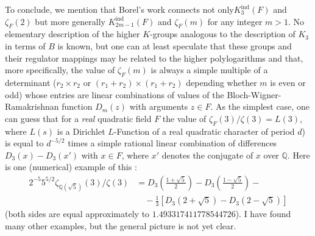 To conclude, we mention that Borel's work connects not only\break $K^{\text{ind}}_{3}(F)$ and $\zeta_{F}(2)$ but more generally $K^{\text{ind}}_{2m-1}(F)$ and $\zeta_{F}(m)$ for any integer $m>1$. No elementary description of the higher $K$-groups analogous to the description of $K_{3}$ in terms of $B$ is known, but one can at least speculate that these groups and their regulator mappings may be related to the higher polylogarithms and that, more specifically, the value of $\zeta_{F}(m)$ is always a simple multiple of a determinant ($r_{2}\times r_{2}$ or $(r_{1}+r_{2})\times (r_{1}+r_{2})$ depending whether $m$ is even or odd) whose entries are linear combinations of values of the Bloch-Wigner-Ramakrishnan function $D_{m}(z)$ with arguments $z\in F$. As the simplest case, one can guess that for a {\em real} quadratic field $F$ the value of $\zeta_{F}(3)/\zeta(3)=L(3)$, where $L(s)$ is a Dirichlet $L$-Function of a real quadratic character of period $d$) is equal to $d^{-5/2}$ times a simple rational linear combination of differences $D_{3}(x)-D_{3}(x')$ with $x\in F$, where $x'$ denotes the conjugate of $x$ over $\mathbb{Q}$. Here is one (numerical) example of this :
\begin{align*}
2^{-5}5^{5/2}\zeta_{\mathbb{Q}(\sqrt{5})}(3)/\zeta(3) &= D_{3}\left(\frac{1+\sqrt{5}}{2}\right)-D_{3}\left(\frac{1-\sqrt{5}}{2}\right)-{}\\
&\quad {}-\frac{1}{3}[D_{3}(2+\sqrt{5})-D_{3}(2-\sqrt{5})]
\end{align*}
(both sides are equal approximately to $1.493317411778544726$). I have found many other examples, but the general picture is not yet clear.

